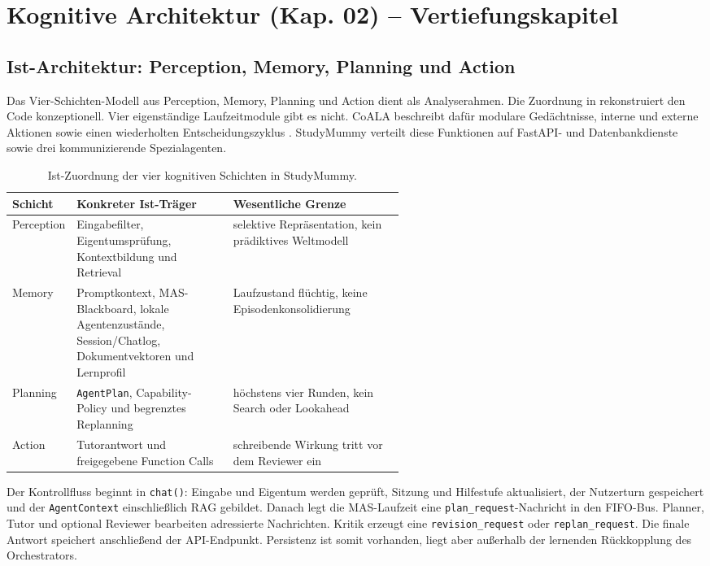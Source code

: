 \section{Kognitive Architektur (Kap. 02) -- Vertiefungskapitel}
\label{sec:kognitive-architektur}

\subsection{Ist-Architektur: Perception, Memory, Planning und Action}

Das Vier-Schichten-Modell aus Perception, Memory, Planning und Action dient als
Analyserahmen. Die Zuordnung in  rekonstruiert den Code
konzeptionell. Vier eigenständige Laufzeitmodule gibt es nicht. CoALA beschreibt
dafür modulare Gedächtnisse, interne und externe Aktionen sowie einen
wiederholten Entscheidungszyklus \parencite{sumersEtAl2024}. StudyMummy verteilt
diese Funktionen auf FastAPI- und Datenbankdienste sowie drei kommunizierende
Spezialagenten.

\begin{table}[htbp]
  \centering
  \footnotesize
  \begin{tabularx}{\linewidth}{@{}p{0.16\linewidth}p{0.40\linewidth}X@{}}
    \toprule
    Schicht & Konkreter Ist-Träger & Wesentliche Grenze \\
    \midrule
    Perception & Eingabefilter, Eigentumsprüfung, Kontextbildung und Retrieval
      & selektive Repräsentation, kein prädiktives Weltmodell \\
    Memory & Promptkontext, MAS-Blackboard, lokale Agentenzustände,
      Session/Chatlog, Dokumentvektoren und Lernprofil
      & Laufzustand flüchtig, keine Episodenkonsolidierung \\
    Planning & \texttt{AgentPlan}, Capability-Policy und begrenztes Replanning
      & höchstens vier Runden, kein Search oder Lookahead \\
    Action & Tutorantwort und freigegebene Function Calls
      & schreibende Wirkung tritt vor dem Reviewer ein \\
    \bottomrule
  \end{tabularx}
  \caption{Ist-Zuordnung der vier kognitiven Schichten in StudyMummy.}
  \label{tab:vier-schichten}
\end{table}

Der Kontrollfluss beginnt in \texttt{chat()}: Eingabe und Eigentum werden
geprüft, Sitzung und Hilfestufe aktualisiert, der Nutzerturn gespeichert und der
\texttt{AgentContext} einschließlich RAG gebildet. Danach legt die MAS-Laufzeit
eine \texttt{plan\_request}-Nachricht in den FIFO-Bus. Planner, Tutor und
optional Reviewer bearbeiten adressierte Nachrichten. Kritik erzeugt eine
\texttt{revision\_request} oder \texttt{replan\_request}. Die finale Antwort
speichert anschließend der API-Endpunkt. Persistenz ist somit vorhanden, liegt
aber außerhalb der lernenden Rückkopplung des Orchestrators.

